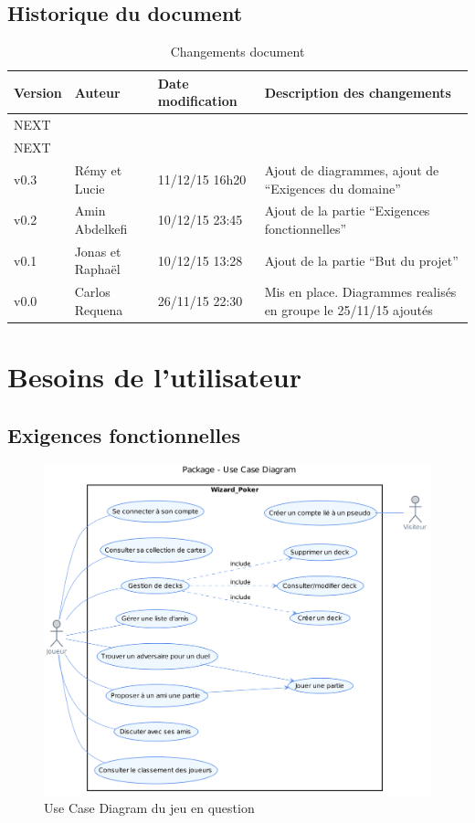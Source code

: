 \documentclass[11pt,a4paper]{article}
\begin{document}
\subsection{Historique du document}
\label{sec:hist}


\begin{table}[h]
  \centering
  \begin{tabular}[ht]{|l|l|l|p{18em}|}
    \hline

    \textbf{Version}
    & \textbf{Auteur}
    & \textbf{Date modification}
    & \textbf{Description des changements}\\ \hline \hline
    NEXT &  &  &  \\ \hline
    NEXT &  &  &  \\ \hline
    v0.3 & Rémy et Lucie  & 11/12/15 16h20 & Ajout de diagrammes, ajout de ``Exigences du domaine'' \\ \hline
    v0.2 & Amin Abdelkefi & 10/12/15 23:45 & Ajout de la partie ``Exigences fonctionnelles''\\ \hline
    v0.1 & Jonas et Raphaël & 10/12/15 13:28 & Ajout de la partie ``But du projet''\\ \hline
    v0.0 & Carlos Requena & 26/11/15 22:30 & Mis en place. Diagrammes realisés en groupe le 25/11/15 ajoutés\\ \hline
  \end{tabular}
  \caption{Changements document}
  \label{tab:hist}
\end{table}

\section{Besoins de l'utilisateur}
\label{sec:besoins}

\subsection{Exigences fonctionnelles}
\label{sec:exi-fonc}
\begin{figure}[ht]
  \centering
  \includegraphics[width=1\textwidth]{uml_files/UseCaseDiagram.png}
  \caption{\label{fig:usecase} Use Case Diagram du jeu en question}
\end{figure}
\end{document}
